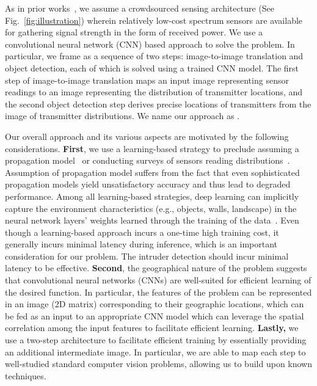   As in prior
works~\cite{mobicom17-splot,chakraborty2017specsense}, we assume a
crowdsourced sensing architecture (See Fig.~\ref{fig:illustration}) wherein relatively low-cost spectrum
sensors are available for gathering signal strength in the form of received power.
We use a convolutional neural network (CNN) based approach
to solve the \mtl problem. In particular, we frame
\mtl as a sequence of two steps: image-to-image translation and object detection, each of which
is solved using a trained CNN model. 
The first step of image-to-image translation maps an input image representing sensor readings to an 
image representing the distribution of transmitter locations, and the second object detection step derives precise
locations of transmitters from the image of transmitter distributions.
We name our \mtl approach as \our.

Our overall approach and its various aspects are motivated by the following considerations. 
{\bf First}, we use a learning-based strategy to 
preclude assuming a propagation model~\cite{mobicom17-splot} or conducting surveys of sensors reading distributions~\cite{ipsn20-mtl}.
Assumption of propagation model suffers from the fact that 
even sophisticated propagation models yield unsatisfactory accuracy and thus lead to degraded performance.
Among all learning-based strategies, deep learning can implicitly capture the environment characteristics (e.g., objects, walls, landscape) in the neural network layers' weights learned through the training of the data~\cite{mobicom20-deeploc}.
Even though a learning-based approach incurs a one-time high training cost,
it generally incurs minimal latency during inference, which is an important consideration for our \mtl problem.
The intruder detection should incur minimal latency to be effective.
{\bf Second}, the geographical nature of the \mtl problem suggests that convolutional neural networks (CNNs) are 
well-suited for efficient
learning of the desired function. In particular, the features of the \mtl problem can be
represented in an image (2D matrix) corresponding to their geographic locations, which can be fed as an input
to an appropriate CNN model which can leverage the spatial correlation among the input features 
to facilitate efficient learning. 
{\bf Lastly,} we use a two-step architecture to  facilitate efficient training by essentially
providing an additional intermediate image. 
In particular,  we are able to map each step to well-studied standard computer vision problems, allowing us to build upon known techniques. 

